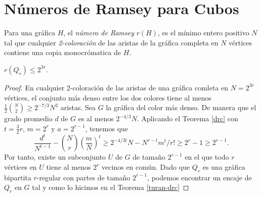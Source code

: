   \section{Números de Ramsey para Cubos}
  Para una gráfica $H$, el \textit{número de Ramsey} $r(H)$, es el
  mínimo entero positivo $N$ tal que cualquier \textit{2-coloración}
  de las aristas de la gráfica completa en $N$ vértices contiene una
  copia monocrómatica de $H$.
  \begin{theorem}
    $r(Q_r) \leq 2^{3r}$.
  \end{theorem}
  \begin{proof}
    En cualquier 2-coloración de las aristas de una gráfica comleta
    en $N = 2^{3r}$ vértices, el conjunto más denso entre los dos
    colores tiene al menos
    $\frac{1}{2} \binom{N}{2} \geq 2^{-7/3} N^2$ aristas. Sea $G$ la gráfica
    del color más denso. De manera que el grado promedio $d$ de $G$
    es al menos $2^{-4/3}N$. Aplicando el Teorema \ref{drc} con $t =
    \frac{3}{2}r$, $m = 2^r$ y $a = 2^{r-1}$, tenemos que
    $$\frac{d^t}{N^{t-1}} - \binom{N}{r} \left(\frac{m}{N}\right)^t
    \geq 2^{-4/3 t} N - N^{r-t}m^t / r! \geq 2^r - 1 \geq 2^{r-1}. $$
    Por tanto, existe un subconjunto $U$ de $G$ de tamaño $2^{r-1}$
    en el que todo $r$ vértices en $U$ tiene al menos $2^r$ vecinos en común.
    Dado que $Q_r$ es una gráfica bipartita $r$-regular con partes de
    tamaño $2^{r-1}$, podemos encontrar un encaje de $Q_r$ en $G$ tal
    y como lo hicimos en el Teorema \ref{turan-drc}
  \end{proof}
